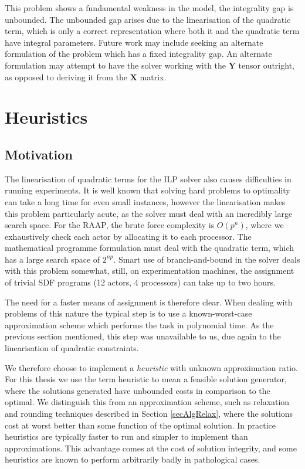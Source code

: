 This problem shows a fundamental weakness in the model, the integrality gap is unbounded.
The unbounded gap arises due to the linearisation of the quadratic term, which is only a correct representation where both it and the quadratic term have integral parameters.
Future work may include seeking an alternate formulation of the problem which has a fixed integrality gap.
An alternate formulation may attempt to have the solver working with the $\mathbf{Y}$ tensor outright, as opposed to deriving it from the $\mathbf{X}$ matrix.

\section{Heuristics}

\subsection{Motivation}

The linearisation of quadratic terms for the ILP solver also causes difficulties in running experiments.
It is well known that solving hard problems to optimality can take a long time for even small instances, however the linearisation makes this problem particularly acute, as the solver must deal with an incredibly large search space.
For the RAAP, the brute force complexity is $O(p^n)$, where we exhaustively check each actor by allocating it to each processor.
The mathematical programme formulation must deal with the quadratic term, which has a large search space of $2^{np}$.
Smart use of branch-and-bound in the solver deals with this problem somewhat, still, on experimentation machines, the assignment of trivial SDF programs (12 actors, 4 processors) can take up to two hours.

The need for a faster means of assignment is therefore clear.
When dealing with problems of this nature the typical step is to use a known-worst-case approximation scheme which performs the task in polynomial time.
As the previous section mentioned, this step was unavailable to us, due again to the linearisation of quadratic constraints.

We therefore choose to implement a {\em heuristic} with unknown approximation ratio.
For this thesis we use the term heuristic to mean a feasible solution generator, where the solutions generated have unbounded costs in comparison to the optimal.
We distinguish this from an approximation scheme, such as relaxation and rounding techniques described in Section \ref{secAlgRelax}, where the solutions cost at worst better than some function of the optimal solution.
In practice heuristics are typically faster to run and simpler to implement than approximations.
This advantage comes at the cost of solution integrity, and some heuristics are known to perform arbitrarily badly in pathological cases.

